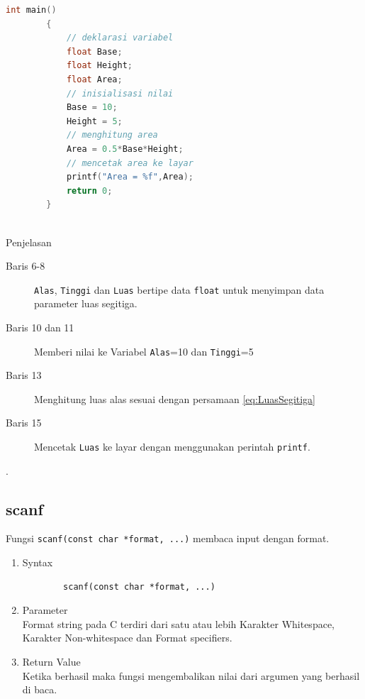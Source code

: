 \begin{description}
\begin{lstlisting}[language=c,captionpos=t]
		int main()
		{
			// deklarasi variabel
			float Base;
			float Height;
			float Area;
			// inisialisasi nilai
			Base = 10;
			Height = 5;
			// menghitung area
			Area = 0.5*Base*Height;
			// mencetak area ke layar
			printf("Area = %f",Area);
			return 0;
		}
		
	\end{lstlisting}

		Penjelasan
		\begin{description}
			\item[Baris 6-8]  \verb|Alas|, \verb|Tinggi| dan \verb|Luas| bertipe data \verb|float| untuk menyimpan data parameter luas segitiga.
			\item[Baris 10 dan 11] Memberi nilai ke Variabel \verb|Alas|=10 dan \verb|Tinggi|=5
			\item[Baris 13] Menghitung luas alas sesuai dengan persamaan \ref{eq:LuasSegitiga}
			\item[Baris 15] Mencetak \verb|Luas| ke layar dengan menggunakan perintah \verb|printf|.
		\end{description}
\end{description}

.\subsection{scanf}
Fungsi  \verb*|scanf(const char *format, ...)| membaca input dengan format.

\begin{enumerate}
	\item Syntax
	      \begin{verbatim}
		scanf(const char *format, ...)
	\end{verbatim}
	\item Parameter \\
	      Format string pada C terdiri dari satu atau lebih Karakter Whitespace, Karakter Non-whitespace dan Format specifiers.
	\item Return Value \\
	      Ketika berhasil maka fungsi mengembalikan nilai dari argumen yang berhasil di baca.

\end{enumerate}

